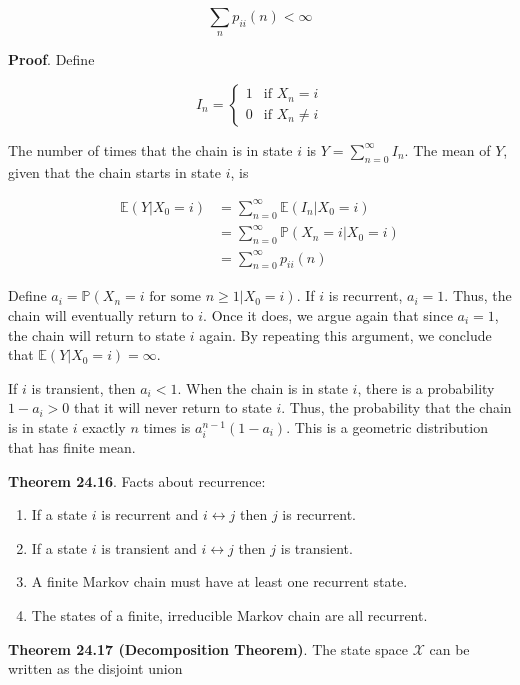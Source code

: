 \[ \sum_n p_{ii}(n) < \infty \]

\textbf{Proof}. Define

\[ 
I_n = \begin{cases}
1 & \text{if } X_n = i \\
0 & \text{if } X_n \neq i
\end{cases}
\]

The number of times that the chain is in state \(i\) is
\(Y = \sum_{n=0}^\infty I_n\). The mean of \(Y\), given that the chain
starts in state \(i\), is

\[
\begin{align}
\mathbb{E}(Y | X_0 = i) &= \sum_{n=0}^\infty \mathbb{E}(I_n | X_0 = i) \\
&= \sum_{n=0}^\infty \mathbb{P}(X_n = i | X_0 = i) \\
&= \sum_{n=0}^\infty p_{ii}(n)
\end{align}
\]

Define
\(a_i = \mathbb{P}(X_n = i \text{ for some } n \geq 1 | X_0 = i)\). If
\(i\) is recurrent, \(a_i = 1\). Thus, the chain will eventually return
to \(i\). Once it does, we argue again that since \(a_i = 1\), the chain
will return to state \(i\) again. By repeating this argument, we
conclude that \(\mathbb{E}(Y | X_0 = i) = \infty\).

If \(i\) is transient, then \(a_i < 1\). When the chain is in state
\(i\), there is a probability \(1 - a_i > 0\) that it will never return
to state \(i\). Thus, the probability that the chain is in state \(i\)
exactly \(n\) times is \(a_i^{n - 1}(1 - a_i)\). This is a geometric
distribution that has finite mean.

\textbf{Theorem 24.16}. Facts about recurrence:

\begin{enumerate}[tightlist,label={\arabic*.}]
\item
  If a state \(i\) is recurrent and \(i \leftrightarrow j\) then \(j\)
  is recurrent.
\item
  If a state \(i\) is transient and \(i \leftrightarrow j\) then \(j\)
  is transient.
\item
  A finite Markov chain must have at least one recurrent state.
\item
  The states of a finite, irreducible Markov chain are all recurrent.
\end{enumerate}

\textbf{Theorem 24.17 (Decomposition Theorem)}. The state space
\(\mathcal{X}\) can be written as the disjoint union

